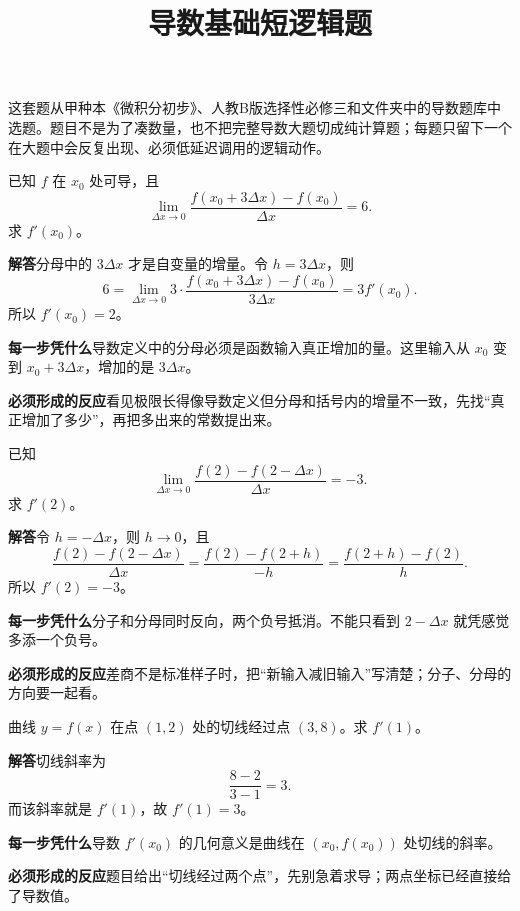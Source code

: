\documentclass[11pt,fontset=fandol]{ctexart}
\title{导数基础短逻辑题}
\author{}
\date{}
\newcommand{\answer}{\par\textbf{解答}\quad}
\newcommand{\basis}{\par\textbf{每一步凭什么}\quad}
\newcommand{\reaction}{\par\textbf{必须形成的反应}\quad}
\newenvironment{drill}[2]{
  \begin{tcolorbox}[colback=white,colframe=black!35,title={#1\quad\small #2},breakable]
}{\end{tcolorbox}}
\begin{document}
\maketitle

这套题从甲种本《微积分初步》、人教B版选择性必修三和文件夹中的导数题库中选题。题目不是为了凑数量，也不把完整导数大题切成纯计算题；每题只留下一个在大题中会反复出现、必须低延迟调用的逻辑动作。

\begin{drill}{1. 极限里的增量不是原封不动的}{甲种本《微积分初步》导数定义题型改编}
已知 $f$ 在 $x_0$ 处可导，且
\[
\lim_{\Delta x\to0}\frac{f(x_0+3\Delta x)-f(x_0)}{\Delta x}=6.
\]
求 $f'(x_0)$。

\answer 分母中的 $3\Delta x$ 才是自变量的增量。令 $h=3\Delta x$，则
\[
6=\lim_{\Delta x\to0}3\cdot\frac{f(x_0+3\Delta x)-f(x_0)}{3\Delta x}
=3f'(x_0).
\]
所以 $f'(x_0)=2$。

\basis 导数定义中的分母必须是函数输入真正增加的量。这里输入从 $x_0$ 变到 $x_0+3\Delta x$，增加的是 $3\Delta x$。

\reaction 看见极限长得像导数定义但分母和括号内的增量不一致，先找“真正增加了多少”，再把多出来的常数提出来。
\end{drill}

\begin{drill}{2. 反向写的差商会改变符号}{甲种本《微积分初步》导数定义题型改编}
已知
\[
\lim_{\Delta x\to0}\frac{f(2)-f(2-\Delta x)}{\Delta x}=-3.
\]
求 $f'(2)$。

\answer 令 $h=-\Delta x$，则 $h\to0$，且
\[
\frac{f(2)-f(2-\Delta x)}{\Delta x}
=\frac{f(2)-f(2+h)}{-h}
=\frac{f(2+h)-f(2)}{h}.
\]
所以 $f'(2)=-3$。

\basis 分子和分母同时反向，两个负号抵消。不能只看到 $2-\Delta x$ 就凭感觉多添一个负号。

\reaction 差商不是标准样子时，把“新输入减旧输入”写清楚；分子、分母的方向要一起看。
\end{drill}

\begin{drill}{3. 导数就是切线斜率}{甲种本《微积分初步》切线习题改编}
曲线 $y=f(x)$ 在点 $(1,2)$ 处的切线经过点 $(3,8)$。求 $f'(1)$。

\answer 切线斜率为
\[
\frac{8-2}{3-1}=3.
\]
而该斜率就是 $f'(1)$，故 $f'(1)=3$。

\basis 导数 $f'(x_0)$ 的几何意义是曲线在 $(x_0,f(x_0))$ 处切线的斜率。

\reaction 题目给出“切线经过两个点”，先别急着求导；两点坐标已经直接给了导数值。
\end{drill}
\end{document}
